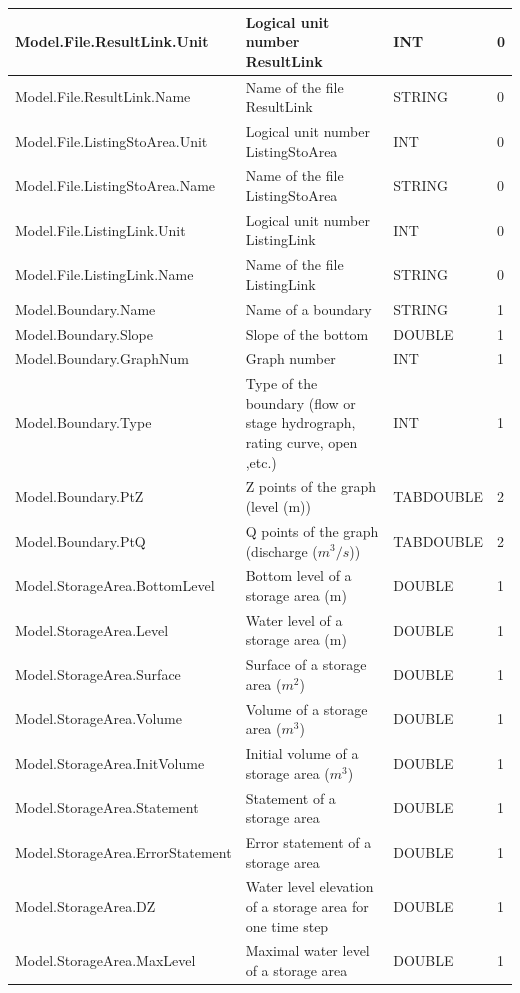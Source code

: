 \documentclass[a4paper,11pt]{article}
\begin{document}
\begin{landscape}
\begin{table}[ht]
\begin{center}
\begin{tabular}{|l|l|l|l|}
\hline  Model.File.ResultLink.Unit & Logical unit number ResultLink & INT & 0 \\
\hline  Model.File.ResultLink.Name & Name of the file ResultLink & STRING & 0 \\
\hline  Model.File.ListingStoArea.Unit & Logical unit number ListingStoArea & INT & 0 \\
\hline  Model.File.ListingStoArea.Name & Name of the file ListingStoArea & STRING & 0 \\
\hline  Model.File.ListingLink.Unit & Logical unit number ListingLink & INT & 0 \\
\hline  Model.File.ListingLink.Name & Name of the file ListingLink & STRING & 0 \\
\hline  Model.Boundary.Name & Name of a boundary & STRING & 1 \\
\hline  Model.Boundary.Slope & Slope of the bottom & DOUBLE & 1 \\
\hline  Model.Boundary.GraphNum & Graph number & INT & 1 \\
\hline  Model.Boundary.Type & Type of the boundary (flow or stage hydrograph, rating curve, open ,etc.) & INT & 1 \\
\hline  Model.Boundary.PtZ & Z points of the graph (level (m)) & TABDOUBLE & 2 \\
\hline  Model.Boundary.PtQ & Q points of the graph (discharge ($m^3/s$)) & TABDOUBLE & 2 \\
\hline  Model.StorageArea.BottomLevel & Bottom level of a storage area (m) & DOUBLE & 1 \\
\hline  Model.StorageArea.Level & Water level of a storage area (m) & DOUBLE & 1 \\
\hline  Model.StorageArea.Surface & Surface of a storage area ($m^2$) & DOUBLE & 1 \\
\hline  Model.StorageArea.Volume & Volume of a storage area ($m^3$) & DOUBLE & 1 \\
\hline  Model.StorageArea.InitVolume & Initial volume of a storage area ($m^3$) & DOUBLE & 1 \\
\hline  Model.StorageArea.Statement & Statement of a storage area & DOUBLE & 1 \\
\hline  Model.StorageArea.ErrorStatement & Error statement of a storage area & DOUBLE & 1 \\
\hline  Model.StorageArea.DZ & Water level elevation of a storage area for one time step & DOUBLE & 1 \\
\hline  Model.StorageArea.MaxLevel & Maximal water level of a storage area & DOUBLE & 1 \\

\end{tabular}
\end{center}
\end{table}
\end{landscape}
\end{document}
